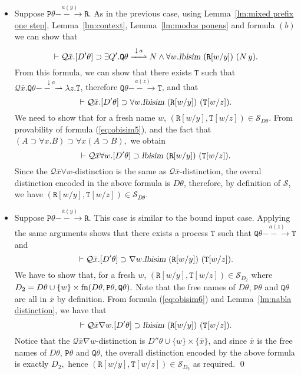 \documentclass{acmtrans2m}
\def\Qscr{{\mathcal Q}}
\def\Sscr{{\mathcal S}}
\def\Ppi{{\mathtt P}}
\def\Qpi{{\mathtt Q}}
\def\Rpi{{\mathtt R}}
\def\Tpi{{\mathtt T}}
\newcommand{\lbisim}[2]{\hbox{\sl lbisim}~#1~#2}
\newcommand{\inact}{\mathop{\downarrow}}
\newcommand{\oimp}{\supset}
\newcommand{\one  }[3]{#1\stackrel{#2}{-\!\!-\!\!\!\rightarrow    } #3}
\newcommand{\onep }[3]{#1\stackrel{#2}{-\!\!-\!\!\!\rightharpoonup} #3}
\newcommand{\fn}[1]{{\rm fn}(#1)}
\begin{document}
\begin{itemize}
\item Suppose $\one{\Ppi\theta }{a(y)}{\Rpi}.$
As in the previous case, using Lemma~\ref{lm:mixed prefix one step}, Lemma~\ref{lm:context}, 
Lemma~\ref{lm:modus ponens} and formula $(b)$
we can show that 
$$
\vdash \Qscr \bar x. [D'\theta] \oimp \exists Q'. \onep{\Qpi\theta}{\inact a}{N} \land \forall w.\lbisim {(\Rpi[w/y])} {(N\,y)}.
$$
From this formula, we can show that there exists $\Tpi$ such that $\Qscr \bar x. \onep{\Qpi\theta}{\inact a}{\lambda z.\Tpi}$,
therefore $\one{\Qpi\theta}{a(z)}{\Tpi}$, and that 
\begin{equation}
\label{eq:obisim5}
\vdash \Qscr \bar x. [D'\theta] \oimp \forall w.\lbisim {(\Rpi[w/y])}{(\Tpi[w/z])}.
\end{equation}
We need to show that for a fresh name $w$, $(\Rpi[w/y], \Tpi[w/z]) \in \Sscr_{D\theta}.$ 
From provability of formula (\ref{eq:obisim5}), and the fact that
$(A \oimp \forall x.B) \oimp \forall x(A \oimp B),$ we obtain
$$
\vdash \Qscr \bar x \forall w. [D'\theta] \oimp \lbisim {(\Rpi[w/y])}{(\Tpi[w/z])}.
$$
Since the $\Qscr\bar x\forall w$-distinction is the same as $\Qscr \bar x$-distinction,
the overal distinction encoded in the above formula is $D\theta$, therefore, by definition
of $\Sscr$, we have 
$(\Rpi[w/y], \Tpi[w/z]) \in \Sscr_{D\theta}.$ 

\item Suppose $\one{\Ppi\theta}{\bar a(y)}{\Rpi}.$ This case is similar to the bound input
case. Applying the same arguments shows that there exists a process $\Tpi$
such that $\one{\Qpi\theta}{a(z)}{\Tpi}$ and 
\begin{equation}
\label{eq:obisim6}
\vdash \Qscr \bar x. [D'\theta] \oimp \nabla w. \lbisim {(\Rpi[w/y])}{(\Tpi[w/z])}.
\end{equation}
We have to show that, for a fresh $w$, 
$(\Rpi[w/y], \Tpi[w/z]) \in \Sscr_{D_2}$ where $D_2 = D\theta \cup \{w \} \times \fn{D\theta , \Ppi\theta, \Qpi\theta }.$
Note that the free names of $D\theta$, $\Ppi\theta$ and $\Qpi\theta$ are all in $\bar x$ by definition.
From formula (\ref{eq:obisim6}) and Lemma~\ref{lm:nabla distinction}, we have that
$$
\vdash \Qscr \bar x \nabla w. [D'\theta] \oimp \lbisim {(\Rpi[w/y])}{(\Tpi[w/z])}.
$$
Notice that the $\Qscr \bar x \nabla w$-distinction is 
$D''\theta \cup \{w \} \times \{\bar x \}$, and since $\bar x$ is the free names of $D\theta$, $\Ppi\theta$
and $\Qpi\theta$, the overall distinction encoded by the above formula is exactly
$D_2,$ hence $(\Rpi[w/y], \Tpi[w/z]) \in \Sscr_{D_2}$ as required. \qed
\end{itemize}
\end{document}
